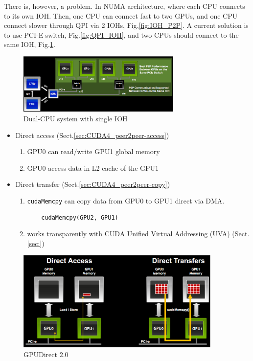 There is, however, a problem. In NUMA architecture, where each CPU connects to
its own IOH. Then, one CPU can connect fast to two GPUs, and one CPU connect
slower through QPI via 2 IOHs, Fig.\ref{fig:IOH_P2P}. A current solution is to
use PCI-E switch, Fig.\ref{fig:QPI_IOH}, and two CPUs should connect to the
same IOH, Fig.\ref{fig:QPI_PCIswitch}.

\begin{figure}[hbt]
  \centerline{\includegraphics[height=3cm,
    angle=0]{./images/QPI_PCIswitch.eps}}
\caption{Dual-CPU system with single IOH}
\label{fig:QPI_PCIswitch}
\end{figure}

\begin{itemize}
  \item Direct access (Sect.\ref{sec:CUDA4_peer2peer-access})
  \begin{enumerate}
  \item GPU0 can read/write GPU1 global memory
  \item GPU0 access data in L2 cache of the GPU1
  \end{enumerate}
  
  \item Direct transfer (Sect.\ref{sec:CUDA4_peer2peer-copy})
  \begin{enumerate}
    \item \verb!cudaMemcpy! can copy data from GPU0 to GPU1 direct via DMA.
    \begin{lstlisting}
    cudaMemcpy(GPU2, GPU1)
    \end{lstlisting}
    \item works transparently with CUDA Unified Virtual Addressing (UVA)
    (Sect.\ref{sec:})
  \end{enumerate}
\end{itemize} 

\begin{figure}[hbt]
  \centerline{\includegraphics[height=5cm,
    angle=0]{./images/GPUDirect2.eps}}
\caption{GPUDirect 2.0}
\label{fig:GPUDirect2.0}
\end{figure}

